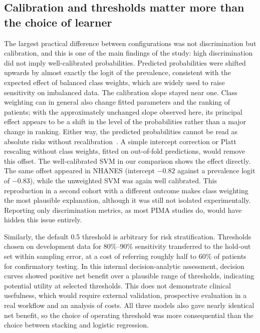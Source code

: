 \documentclass[preprint,12pt,authoryear=false]{elsarticle}
\begin{document}
\subsection{Calibration and thresholds matter more than the choice of learner}
The largest practical difference between configurations was not discrimination but calibration, and this is one of the main findings of the study: high discrimination did not imply well-calibrated probabilities. Predicted probabilities were shifted upwards by almost exactly the logit of the prevalence, consistent with the expected effect of balanced class weights, which are widely used to raise sensitivity on imbalanced data. The calibration slope stayed near one. Class weighting can in general also change fitted parameters and the ranking of patients; with the approximately unchanged slope observed here, its principal effect appears to be a shift in the level of the probabilities rather than a major change in ranking. Either way, the predicted probabilities cannot be read as absolute risks without recalibration~\cite{vancalster2019calibration}. A simple intercept correction or Platt rescaling without class weights, fitted on out-of-fold predictions, would remove this offset. The well-calibrated SVM in our comparison shows the effect directly. The same offset appeared in NHANES (intercept $-0.82$ against a prevalence logit of $-0.83$), while the unweighted SVM was again well calibrated. This reproduction in a second cohort with a different outcome makes class weighting the most plausible explanation, although it was still not isolated experimentally. Reporting only discrimination metrics, as most PIMA studies do, would have hidden this issue entirely.

Similarly, the default 0.5 threshold is arbitrary for risk stratification. Thresholds chosen on development data for 80\%--90\% sensitivity transferred to the hold-out set within sampling error, at a cost of referring roughly half to 60\% of patients for confirmatory testing. In this internal decision-analytic assessment, decision curves showed positive net benefit over a plausible range of thresholds, indicating potential utility at selected thresholds. This does not demonstrate clinical usefulness, which would require external validation, prospective evaluation in a real workflow and an analysis of costs. All three models also gave nearly identical net benefit, so the choice of operating threshold was more consequential than the choice between stacking and logistic regression.
\end{document}
